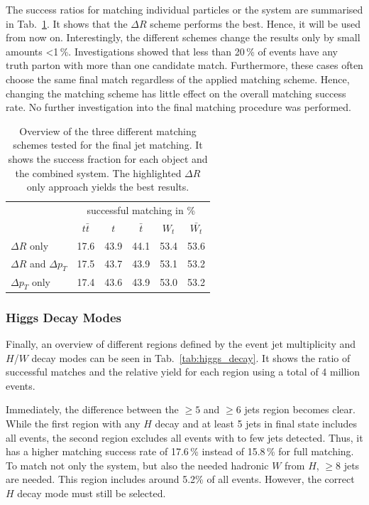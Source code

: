 \documentclass[bachelor,ngerman,english]{GAUBM}
\begin{document}
The success ratios for matching individual particles or the \ttbar system are summarised in Tab.~\ref{tab:final_selection}. It shows that the $\Delta R$ scheme performs the best. Hence, it will be used from now on. Interestingly, the different schemes change the results only by small amounts <1\,\%. Investigations showed that less than 20\,\% of events have any truth parton with more than one candidate match. Furthermore, these cases often choose the same final match regardless of the applied matching scheme. Hence, changing the matching scheme has little effect on the overall matching success rate. No further investigation into the final matching procedure was performed. 

\begin{table}
    \centering
    \caption{Overview of the three different matching schemes tested for the final jet matching. It shows the success fraction for each object and the combined \ttbar system. The highlighted $\Delta R$ only approach yields the best results.}
    \begin{tabular}{l|c|c|c|c|c|}
        &\multicolumn{5}{c|}{successful matching in \%}\\
        & $t\bar{t}$ & $t$ & $\bar{t}$ & $W_t$ & $\bar{W_t}$\\
        \hline
        \rowcolor{highlighter!40}
        $\Delta R$ only & 17.6 & 43.9 & 44.1 & 53.4 & 53.6\\
        $\Delta R$ and $\Delta p_T$ & 17.5 & 43.7 & 43.9 & 53.1 & 53.2\\
        $\Delta p_T$ only & 17.4 & 43.6 & 43.9 & 53.0 & 53.2\\
    \end{tabular}
    \label{tab:final_selection}
\end{table}

\subsubsection*{Higgs Decay Modes}
Finally, an overview of different regions defined by the event jet multiplicity and $H$/$W$ decay modes can be seen in Tab.~\ref{tab:higgs_decay}. It shows the ratio of successful matches and the relative yield for each region using a total of 4 million events.

Immediately, the difference between the $\geq5$ and $\geq6$ jets region becomes clear. While the first region with any $H$ decay and at least 5 jets in final state includes all events, the second region excludes all events with to few jets detected. Thus, it has a higher matching success rate of 17.6\,\% instead of 15.8\,\% for full \ttbar matching. To match not only the \ttbar system, but also the needed hadronic $W$ from $H$, $\geq8$ jets are needed. This region includes around 5.2\% of all events. However, the correct $H$ decay mode must still be selected.
\end{document}

